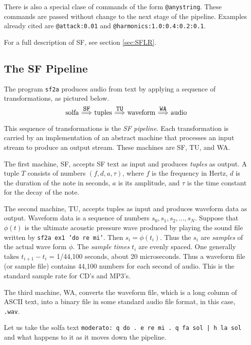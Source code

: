 \documentclass[11pt]{amsart}
\newcommand{\mapright}[1]{\ \smash{ 
   \mathop{\Longrightarrow}\limits^{#1}}\ }
\begin{document}
There is also a special clase of commands of the form {\tt @anystring}.  These commands are passed without
change to the next stage of the pipeline.  Examples already cited are {\tt @attack:0.01} and 
{\tt @harmonics:1.0:0.4:0.2:0.1}.

For a full description of SF, see section \ref{sec:SFLR}.





\subsection{The SF Pipeline}

The program {\tt sf2a} produces audio from text by applying a sequence of transformations, as pictured below. 

\[
  \hbox{solfa} 
  \mapright{\hbox{\tt SF}}
  \hbox{tuples}
  \mapright{\hbox{\tt TU}}
  \hbox{waveform}
  \mapright{\hbox{\tt WA}}
  \hbox{audio}
\]

This sequence of transformations is the \emph{SF pipeline}.  
Each transformation is carried by an implementation of
an abstract machine that processes an input stream to produce an output
stream.  These machines are SF, TU, and WA.  

The first machine, SF, accepts
SF text as input and produces \emph{tuples} as output.
A tuple $T$ consists of numbers $(f,d, a, \tau)$,
where $f$ is the frequency in Hertz, $d$ is the duration of the note in seconds,
$a$ is its amplitude, and $\tau$ is the time constant for the decay of the note.

The second machine, TU, accepts tuples as input and produces waveform data as 
output. Waveform data is a sequence of numbers $s_0, s_1, s_2, \ldots, s_N$.
Suppose that $\phi(t)$ is the ultimate acoustic pressure wave produced by playing 
the sound file written by {\tt sf2a ex1 'do re mi'}.  Then $s_i = \phi(t_i)$.
Thus the $s_i$ are \emph{samples} of the actual wave form $\phi$. The \emph{sample times}
$t_i$ are evenly spaced.  One generally takes $t_{i+1} - t_{i}$ = 1/44,100 seconds,
about 20 microseconds.  Thus a waveform file (or sample file) contains 44,100 numbers
for each second of audio. This is the standard sample rate for CD's and MP3's.

The third machine, WA, converts the waveform file, which is a long column of ASCII text,
into a binary file in some standard audio file format, in this case, {\tt.wav}.

Let us take the solfa text {\tt moderato: q do . e re mi . q fa sol | h la sol} and 
what happens to it as it moves down the pipeline.
\end{document}
